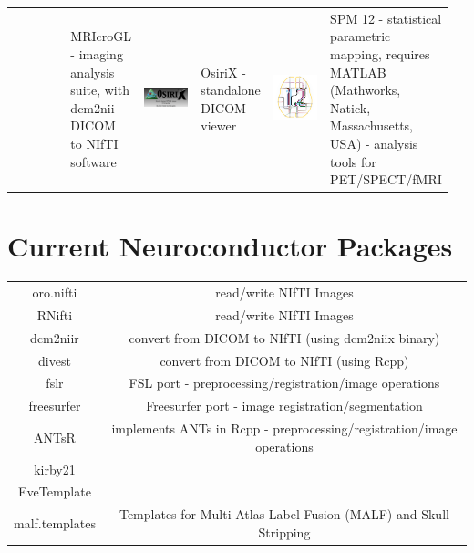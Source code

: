 \documentclass[final]{beamer}\usepackage[]{graphicx}\usepackage[]{color}
\begin{document}
\begin{frame}[fragile]
\begin{table}[!htb]
\begin{minipage}{0.40\linewidth}
\begin{tabular}{>{\centering}m{0.16\linewidth}>{\centering}m{0.16\linewidth}|>{\centering}m{0.16\linewidth}>{\centering}m{0.16\linewidth}|>{\centering}m{0.16\linewidth}>{\centering\arraybackslash}m{0.16\linewidth}}
& MRIcroGL - imaging analysis suite, with dcm2nii - DICOM to NIfTI software
& \includegraphics[clip, width=5cm, keepaspectratio]{figures/OsiriX.png}
& OsiriX - standalone DICOM viewer  
& \includegraphics[clip, width=5cm, keepaspectratio]{figures/spm12.png} & SPM 12 - statistical parametric mapping, requires MATLAB (Mathworks, Natick, Massachusetts, USA) - analysis tools for PET/SPECT/fMRI
\end{tabular}


\section{Current Neuroconductor Packages}
\begin{tabular}{cc}
oro.nifti & read/write NIfTI Images \\
RNifti & read/write NIfTI Images \\
dcm2niir & convert from DICOM to NIfTI (using dcm2niix binary) \\
divest & convert from DICOM to NIfTI (using Rcpp) \citep{rcpp} \\
fslr & FSL port - preprocessing/registration/image operations \\
freesurfer & Freesurfer port - image registration/segmentation \\
ANTsR & implements ANTs in Rcpp - preprocessing/registration/image operations \\
kirby21 &  \citep{kirby} \\ 
EveTemplate  \\
malf.templates & Templates \citep{bennett2012miccai} for Multi-Atlas Label Fusion (MALF) and Skull Stripping \\
\end{tabular}





\end{minipage}
\end{table}
\end{frame}
\end{document}
